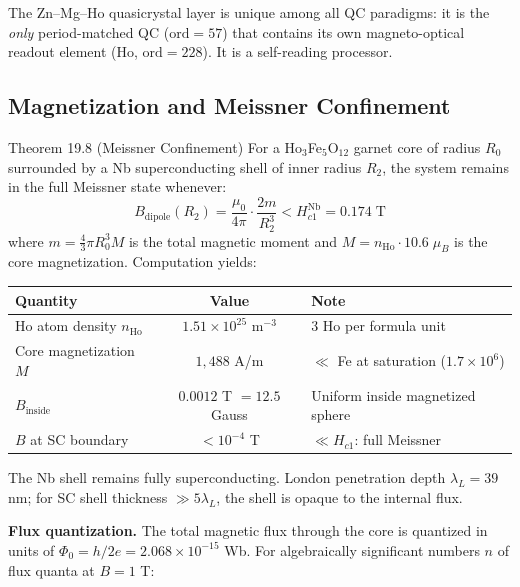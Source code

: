 \noindent The Zn--Mg--Ho quasicrystal layer is unique among all QC paradigms: it is the \emph{only} period-matched QC ($\mathrm{ord} = 57$) that contains its own magneto-optical readout element (Ho, $\mathrm{ord} = 228$). It is a self-reading processor.

\subsection{Magnetization and Meissner Confinement}

\begin{theorembox}{Theorem 19.8 (Meissner Confinement)}
For a Ho$_3$Fe$_5$O$_{12}$ garnet core of radius $R_0$ surrounded by a Nb superconducting shell of inner radius $R_2$, the system remains in the full Meissner state whenever:
\begin{equation}
    B_{\text{dipole}}(R_2) = \frac{\mu_0}{4\pi} \cdot \frac{2m}{R_2^3} < H_{c1}^{\text{Nb}} = 0.174 \;\text{T}
\end{equation}
where $m = \frac{4}{3}\pi R_0^3 M$ is the total magnetic moment and $M = n_{\text{Ho}} \cdot 10.6\;\mu_B$ is the core magnetization. Computation yields:
\begin{center}
\begin{tabular}{@{}lcl@{}}
\toprule
\textbf{Quantity} & \textbf{Value} & \textbf{Note} \\
\midrule
Ho atom density $n_{\text{Ho}}$ & $1.51 \times 10^{25}$ m$^{-3}$ & 3 Ho per formula unit \\
Core magnetization $M$ & $1{,}488$ A/m & $\ll$ Fe at saturation ($1.7 \times 10^6$) \\
$B_{\text{inside}}$ & $0.0012$ T $= 12.5$ Gauss & Uniform inside magnetized sphere \\
$B$ at SC boundary & $< 10^{-4}$ T & $\ll H_{c1}$: full Meissner \\
\bottomrule
\end{tabular}
\end{center}
The Nb shell remains fully superconducting. London penetration depth $\lambda_L = 39$ nm; for SC shell thickness $\gg 5\lambda_L$, the shell is opaque to the internal flux.
\end{theorembox}

\noindent \textbf{Flux quantization.} The total magnetic flux through the core is quantized in units of $\Phi_0 = h/2e = 2.068 \times 10^{-15}$ Wb. For algebraically significant numbers $n$ of flux quanta at $B = 1$ T:

